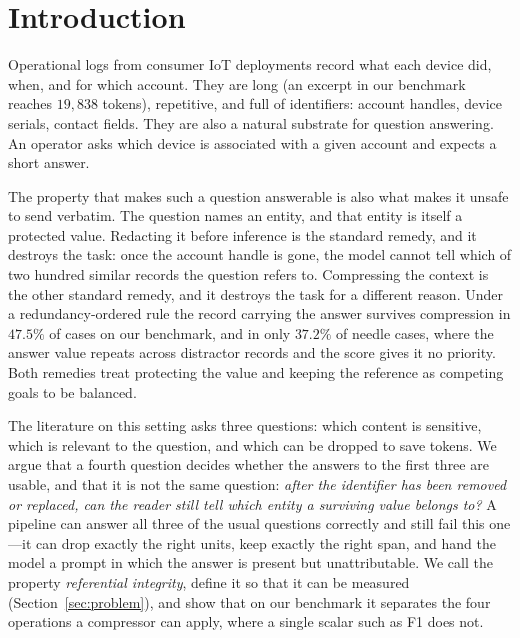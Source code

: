 \section{Introduction}
\label{sec:intro}

Operational logs from consumer IoT deployments record what each device did, when, and for
which account. They are long (an excerpt in our benchmark reaches $19{,}838$ tokens),
repetitive, and full of identifiers: account handles, device serials, contact fields. They
are also a natural substrate for question answering. An operator asks which device is
associated with a given account and expects a short answer.

The property that makes such a question answerable is also what makes it unsafe to send
verbatim. The question names an entity, and that entity is itself a protected value.
Redacting it before inference is the standard remedy, and it destroys the task: once the
account handle is gone, the model cannot tell which of two hundred similar records the
question refers to. Compressing the context is the other standard remedy, and it destroys
the task for a different reason. Under a redundancy-ordered rule the record carrying the
answer survives compression in $47.5\%$ of cases on our benchmark, and in only $37.2\%$ of
needle cases, where the answer value repeats across distractor records and the score gives it
no priority. Both remedies treat protecting the value and keeping the reference as competing
goals to be balanced.

The literature on this setting asks three questions: which content is sensitive, which is
relevant to the question, and which can be dropped to save tokens. We argue that a fourth
question decides whether the answers to the first three are usable, and that it is not the same
question: \emph{after the identifier has been removed or replaced, can the reader still tell
which entity a surviving value belongs to?} A pipeline can answer all three of the usual
questions correctly and still fail this one---it can drop exactly the right units, keep exactly
the right span, and hand the model a prompt in which the answer is present but unattributable.
We call the property \emph{referential integrity}, define it so that it can be measured
(Section~\ref{sec:problem}), and show that on our benchmark it separates the four operations a
compressor can apply, where a single scalar such as F1 does not.

